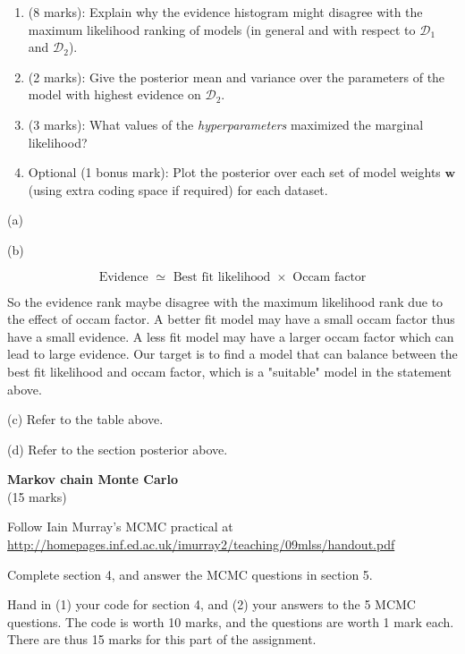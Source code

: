 \documentclass[11pt]{article}
\newcommand{\mbf}[1]{{\boldsymbol{\mathbf{#1}}}}
\renewcommand{\bm}{\mbf}
\begin{document}
\begin{enumerate}
\begin{enumerate}
\item (8 marks): Explain why the evidence histogram might disagree with the maximum likelihood ranking of models (in general and with respect to $\mathcal{D}_1$ and $\mathcal{D}_2$).
\item (2 marks): Give the posterior mean and variance over the parameters of the model with highest evidence on $\mathcal{D}_2$.
\item (3 marks): What values of the \emph{hyperparameters} maximized the marginal likelihood? 
\item Optional (1 bonus mark): Plot the posterior over each set of model weights $\bm{w}$  (using extra coding space if required) for each dataset.

\end{enumerate}

\end{enumerate}

(a)
 
(b)


\begin{equation}
    \text { Evidence } \simeq \text { Best fit likelihood } \times \text { Occam factor }
\end{equation}

So the evidence rank maybe disagree with the maximum likelihood rank due to the effect of occam factor. A better fit model may have a small occam factor thus have a small evidence. A less fit model may have a larger occam factor which can lead to large evidence. Our target is to find a model that can balance between the best fit likelihood and occam factor, which is a "suitable" model in the statement above.

(c)
Refer to the table above.


(d)
Refer to the section posterior above.




\vspace{10mm}
\textbf{Markov chain Monte Carlo} \\
(15 marks)

Follow Iain Murray's MCMC practical at \\
\url{http://homepages.inf.ed.ac.uk/imurray2/teaching/09mlss/handout.pdf}

Complete section 4, and answer the MCMC questions in section 5.

Hand in (1) your code for section 4, and (2) your answers to the 5 MCMC questions.  The code is worth 10 marks, and the questions are worth 1 mark each.  There are thus 15 marks for this part of the assignment.


% 

% 
 
\end{document}
